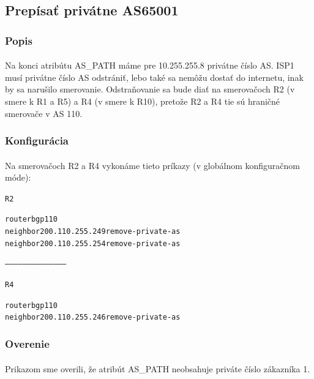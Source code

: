 \documentclass[12pt,twoside,a4paper]{report}
\begin{document}
\subsection{Prepísať privátne AS65001}
\subsubsection{Popis}
\paragraph{}
Na konci atribútu AS\_PATH máme pre 10.255.255.8 privátne číslo AS. ISP1 musí privátne číslo AS odstrániť, lebo také sa nemôžu dostať do internetu, inak by sa narušilo smerovanie. Odstraňovanie sa bude diať na smerovačoch R2 (v smere k R1 a R5) a R4 (v smere k R10), pretože R2 a R4 tie sú hraničné smerovače v AS 110.



\subsubsection{Konfigurácia}
\paragraph{}
Na smerovačoch R2 a R4 vykonáme tieto príkazy (v globálnom konfiguračnom móde):

\noindent
{\selectfont
\begin{small}
\begin{alltt}
R2

router bgp 110
neighbor 200.110.255.249 remove-private-as
neighbor 200.110.255.254 remove-private-as

------------------------------------------

R4

router bgp 110
neighbor 200.110.255.246 remove-private-as
\end{alltt}
\end{small}
}


\subsubsection{Overenie}
\paragraph{}
Prikazom  sme overili, že atribút AS\_PATH neobsahuje priváte číslo zákazníka 1.
\end{document}

